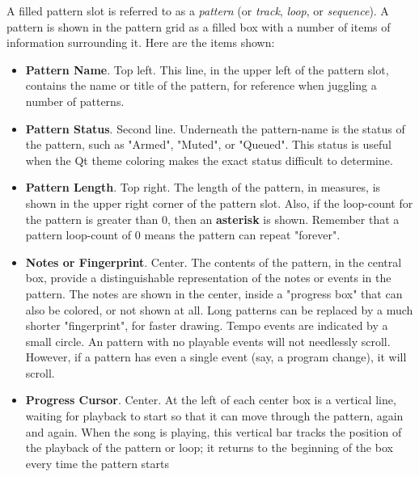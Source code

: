    A filled pattern slot is referred to as a \textsl{pattern}
   (or \textsl{track}, \textsl{loop}, or \textsl{sequence}).
   A pattern is shown in the pattern grid as a filled box with a number of
   items of information surrounding it.  Here are the items shown:

   \begin{itemize}
      \item \textbf{Pattern Name}. Top left.
         This line, in the upper left of the pattern slot, contains the name or
         title of the pattern, for reference when juggling a number of
         patterns.
      \item \textbf{Pattern Status}. Second line.
         Underneath the pattern-name is the status of the pattern, such as
         "Armed", "Muted", or "Queued".
         This status is useful when the Qt theme coloring makes the exact
         status difficult to determine.
      \item \textbf{Pattern Length}. Top right.
         The length of the pattern, in measures, is shown in the upper
         right corner of the pattern slot.
         Also, if the loop-count for the pattern is greater than 0, 
         then an \textbf{asterisk} is shown.
         Remember that a pattern loop-count of 0 means the pattern can repeat
         "forever".
      \item \textbf{Notes or Fingerprint}. Center.
         The contents of the pattern, in the central box,
         provide a distinguishable representation of the notes or events in the
         pattern.
         The notes are shown in the center, inside a "progress box" that
         can also be colored, or not shown at all.
         Long patterns can be replaced by a much shorter "fingerprint", for
         faster drawing.
         Tempo events are indicated by a small circle.
         An pattern with no playable events will not needlessly scroll.
         However, if a pattern has even a single event (say, a program change),
         it will scroll.
      \item \textbf{Progress Cursor}. Center.
         At the left of each center box is a vertical line, waiting for
         playback to start so that it can move through the pattern, again and
         again.
         When the song is playing, this vertical bar
         tracks the position of the playback of the pattern or loop; it
         returns to the beginning of the box every time the pattern starts

\end{itemize}
